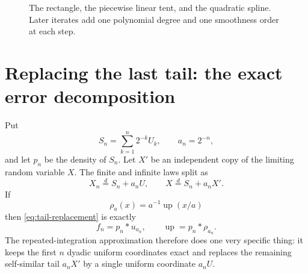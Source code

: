 \documentclass[11pt,oneside]{article}
\theoremstyle{definition}
\theoremstyle{remark}
\newcommand{\Up}{\operatorname{up}}
\newcommand{\conv}{*}
\begin{document}
\begin{figure}[htbp]
\centering
{}
\caption{The rectangle, the piecewise linear tent, and the quadratic spline.  Later
iterates add one polynomial degree and one smoothness order at each step.}
\label{fig:first-iterates}
\end{figure}

\section{Replacing the last tail: the exact error decomposition}
\label{sec:error-decomposition}

Put
\begin{equation}
 S_n=\sum_{k=1}^{n}2^{-k}U_k,
 \qquad a_n=2^{-n},
 \label{eq:Sn-an}
\end{equation}
and let $p_n$ be the density of $S_n$.  Let $X'$ be an independent copy of the limiting
random variable $X$.  The finite and infinite laws split as
\begin{equation}
 X_n\stackrel d=S_n+a_nU,
 \qquad
 X\stackrel d=S_n+a_nX'.
 \label{eq:tail-replacement}
\end{equation}
If
\begin{equation}
 \rho_a(x)=a^{-1}\Up(x/a)
 \label{eq:scaled-up-density}
\end{equation}
then \eqref{eq:tail-replacement} is exactly
\begin{equation}
 f_n=p_n\conv u_{a_n},
 \qquad
 \Up=p_n\conv\rho_{a_n}.
 \label{eq:finite-infinite-convolution-split}
\end{equation}
The repeated-integration approximation therefore does one very specific thing: it keeps the
first $n$ dyadic uniform coordinates exact and replaces the remaining self-similar tail
$a_nX'$ by a single uniform coordinate $a_nU$.
\end{document}
